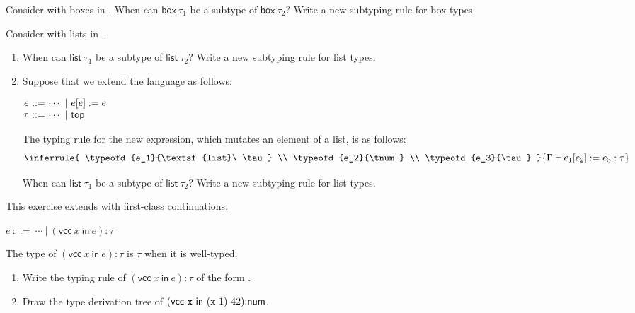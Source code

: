 \begin{exercise}

Consider \plang with boxes in .
  When can $\textsf{box}\ \tau_1$ be a subtype of $\textsf{box}\ \tau_2$?
  Write a new subtyping rule for box types.

\end{exercise}

\begin{exercise}

Consider \plang with lists in .
  \begin{enumerate}
    \item When can $\textsf{list}\ \tau_1$ be a subtype of $\textsf{list}\
      \tau_2$? Write a new subtyping rule for list types.
    \item Suppose that we extend the language as follows:

      \vspace{0.5em}
      $\begin{array}{@{}r@{~}r@{~}l@{}}
        e & ::= & \cdots\ |\ e[e]:=e \\
        \tau & ::= & \cdots\ |\ \ttop \\
      \end{array}$
      \vspace{0.5em}

      The typing rule for the new expression, which mutates an element of a
      list, is as follows:
      \[
        \inferrule
        { \typeofd{e_1}{\textsf{list}\ \tau} \\
          \typeofd{e_2}{\tnum} \\
          \typeofd{e_3}{\tau}
        }
        { \typeofd{e_1[e_2]:=e_3}{\tau} }
      \]

      When can $\textsf{list}\ \tau_1$ be a subtype of $\textsf{list}\
      \tau_2$? Write a new subtyping rule for list types.
  \end{enumerate}

\end{exercise}

\begin{exercise}

This exercise extends \Lang with first-class continuations.

    \vspace{0.5em}
    $e\ ::=\ \cdots\ |\ (\textsf{vcc}\ x\ \textsf{in}\ e){:}\tau$
    \vspace{0.5em}

    The type of
    $(\textsf{vcc}\ x\ \textsf{in}\ e){:}\tau$ is $\tau$ when it is well-typed.

\begin{enumerate}
  \item
    Write the typing rule of $(\textsf{vcc}\ x\ \textsf{in}\ e){:}\tau$
    of the form .
  \item Draw the type derivation tree of
    $(\textsf{vcc}\ {\code{x}}\ \textsf{in}\ {\eapp{(\eapp{\code{x}}{1})}{42}}){:}\tnum$.
\end{enumerate}

\end{exercise}

